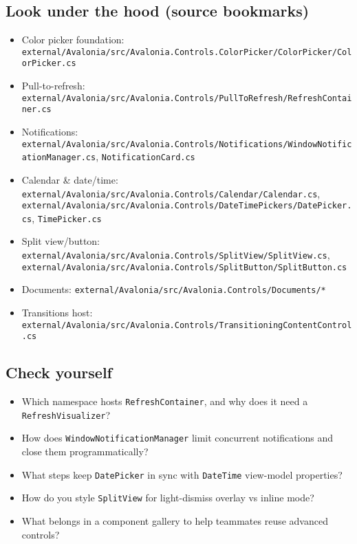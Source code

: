 \subsection{Look under the hood (source
bookmarks)}\label{look-under-the-hood-source-bookmarks-28}

\begin{itemize}
\tightlist
\item
  Color picker foundation:
  \passthrough{\lstinline!external/Avalonia/src/Avalonia.Controls.ColorPicker/ColorPicker/ColorPicker.cs!}
\item
  Pull-to-refresh:
  \passthrough{\lstinline!external/Avalonia/src/Avalonia.Controls/PullToRefresh/RefreshContainer.cs!}
\item
  Notifications:
  \passthrough{\lstinline!external/Avalonia/src/Avalonia.Controls/Notifications/WindowNotificationManager.cs!},
  \passthrough{\lstinline!NotificationCard.cs!}
\item
  Calendar \& date/time:
  \passthrough{\lstinline!external/Avalonia/src/Avalonia.Controls/Calendar/Calendar.cs!},
  \passthrough{\lstinline!external/Avalonia/src/Avalonia.Controls/DateTimePickers/DatePicker.cs!},
  \passthrough{\lstinline!TimePicker.cs!}
\item
  Split view/button:
  \passthrough{\lstinline!external/Avalonia/src/Avalonia.Controls/SplitView/SplitView.cs!},
  \passthrough{\lstinline!external/Avalonia/src/Avalonia.Controls/SplitButton/SplitButton.cs!}
\item
  Documents:
  \passthrough{\lstinline!external/Avalonia/src/Avalonia.Controls/Documents/*!}
\item
  Transitions host:
  \passthrough{\lstinline!external/Avalonia/src/Avalonia.Controls/TransitioningContentControl.cs!}
\end{itemize}

\subsection{Check yourself}\label{check-yourself-29}

\begin{itemize}
\tightlist
\item
  Which namespace hosts \passthrough{\lstinline!RefreshContainer!}, and
  why does it need a \passthrough{\lstinline!RefreshVisualizer!}?
\item
  How does \passthrough{\lstinline!WindowNotificationManager!} limit
  concurrent notifications and close them programmatically?
\item
  What steps keep \passthrough{\lstinline!DatePicker!} in sync with
  \passthrough{\lstinline!DateTime!} view-model properties?
\item
  How do you style \passthrough{\lstinline!SplitView!} for light-dismiss
  overlay vs inline mode?
\item
  What belongs in a component gallery to help teammates reuse advanced
  controls?
\end{itemize}

